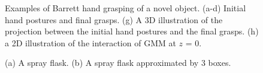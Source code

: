 \begin{figure}
    \hspace{0.005in}

\caption{\scriptsize{Examples of Barrett hand grasping of a novel object. (a-d) Initial hand postures and final grasps. (g) A 3D illustration of the projection between the initial hand postures and the final grasps. (h) a 2D illustration of the interaction of GMM at $z$ = 0.}}

\label{fig_result}
\end{figure}

\begin{figure}
\centering
    \hspace{1cm}
\caption{\scriptsize{(a) A spray flask. (b) A spray flask approximated by 3 boxes.}}
\label{fig:spr}
\end{figure}



